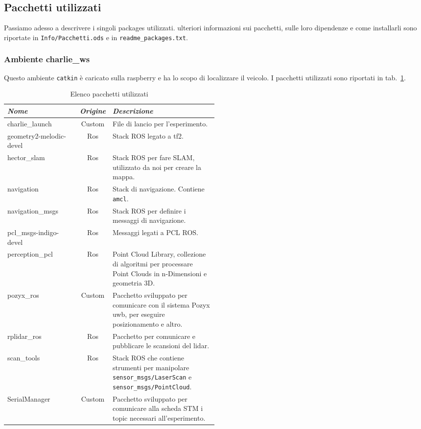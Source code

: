 \subsection{Pacchetti utilizzati}
Passiamo adesso a descrivere i singoli packages utilizzati.
ulteriori informazioni  sui pacchetti, sulle loro dipendenze e come installarli sono riportate in \verb|Info/Pacchetti.ods| e in \verb|readme_packages.txt|.
\subsubsection*{Ambiente charlie\_ws}
Questo ambiente \verb|catkin| \`e caricato sulla raspberry e ha lo scopo di localizzare il veicolo.
I pacchetti utilizzati sono riportati in tab.~\ref{tab: pacchetti charlie}.

\begin{table}[h]
	\centering
	\begin{tabular}{lcp{0.5\linewidth}}
		\textit{Nome} 	& \textit{Origine} & \textit{Descrizione} \\
		\hline
		charlie\_launch				& Custom	& File di lancio per l'esperimento.\\
		geometry2-melodic-devel		& Ros		& Stack ROS legato a tf2.\\
		hector\_slam				& Ros		& Stack ROS per fare SLAM, utilizzato da noi per creare la mappa.\\
		navigation					& Ros		& Stack di navigazione. Contiene \verb|amcl|.\\
		navigation\_msgs			& Ros		& Stack ROS per definire i messaggi di navigazione.\\
		pcl\_msgs-indigo-devel		& Ros		& Messaggi legati a PCL ROS.\\
		perception\_pcl				& Ros		& Point Cloud Library, collezione di algoritmi per processare Point Clouds in n-Dimensioni e geometria 3D.\\ 
		pozyx\_ros					& Custom	& Pacchetto sviluppato per comunicare con il sistema Pozyx uwb, per eseguire posizionamento e altro.\\
		rplidar\_ros				& Ros		& Pacchetto per comunicare e pubblicare le scansioni del lidar.\\
		scan\_tools					& Ros		& Stack ROS che contiene strumenti per manipolare \verb|sensor_msgs/LaserScan| e \verb|sensor_msgs/PointCloud|.\\
		SerialManager				& Custom	& Pacchetto sviluppato per comunicare alla scheda STM i topic necessari all'esperimento.\\
	\end{tabular}
	\caption{Elenco pacchetti utilizzati}
	\label{tab: pacchetti charlie}
\end{table}
\FloatBarrier
	
